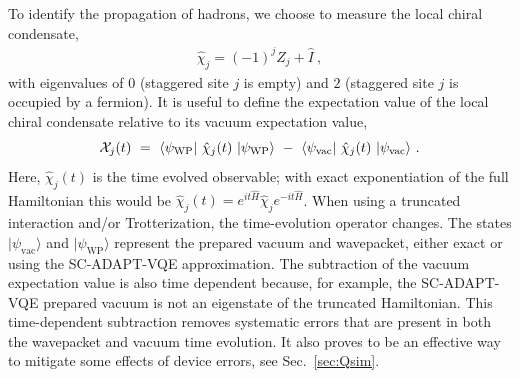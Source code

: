 \documentclass[aps, prc, tightenlines,superscriptaddress, letterpaper, amsmath, amssymb, preprintnumbers, floatfix, longbibliography, nofootinbib]{revtex4-2}
\begin{document}
To identify the propagation of hadrons, we choose to measure the local chiral condensate,
%
\begin{align}
\hat{\chi}_j  = (-1)^j 
\hat{Z}_j + \hat{I} \ ,
\label{eq:localCC}
\end{align}
%
with eigenvalues of 0 (staggered site $j$ is empty) and $2$ (staggered site $j$ is occupied by a fermion).
It is useful to define the expectation value of the local chiral condensate relative to its vacuum expectation value,
%
\begin{equation}
{\cal X}_j(t) 
\ = \ \langle \psi_{\text{WP}}\vert
\ \hat{\chi}_j(t)\  \vert \psi_{\text{WP}} \rangle  
\ - \ \langle \psi_{\text{vac}} \vert\  \hat{\chi}_j(t) \  \vert\psi_{\text{vac}} \rangle 
\ .
\label{eq:chij}
\end{equation}
%
Here, $\hat{\chi}_j(t)$ is the time evolved observable; with exact exponentiation of the full Hamiltonian this would be $\hat{\chi}_j(t) = e^{i t \hat{H}} \hat{\chi}_j e^{-i t \hat{H}}$. 
When using a truncated interaction and/or Trotterization, the time-evolution operator changes.
The states $\vert \psi_{\text{vac}} \rangle $ and $\vert \psi_{\text{WP}} \rangle $ represent the prepared vacuum and wavepacket, either exact or using the SC-ADAPT-VQE approximation.
The subtraction of the vacuum expectation value is also time dependent because, for example, the SC-ADAPT-VQE prepared vacuum is not an eigenstate of the truncated Hamiltonian.
This time-dependent subtraction removes systematic errors that are present in both the wavepacket and vacuum time evolution.
It also proves to be an effective way to mitigate some effects of device errors, see Sec.~\ref{sec:Qsim}.
\end{document}
